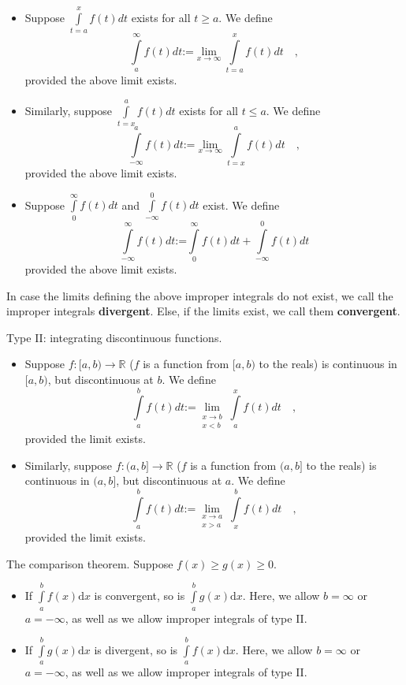 \documentclass[12pt]{book}
\newcommand{\diff}{\text{d}}
\newcommand{\eqdef}{\textbf{:=}}
\renewcommand{\emph}{\textbf}
\begin{document}
\begin{itemize}
\item Suppose $\int\limits_{t=a}^{x}f(t)dt$ exists for all $t\geq a$. We define 
\[
\int\limits_{a}^{\infty} f(t)dt\eqdef  \lim
\limits_{x\to \infty}\int\limits_{t=a}^{x}f(t)dt\quad,
\]
provided the above limit exists.
\item Similarly, suppose $\int\limits_{t=x}^{a}f(t)dt$ exists for all $t\leq a$. We define 
\[
\int\limits_{-\infty}^{a} f(t)dt\eqdef  \lim
\limits_{x\to \infty}\int\limits_{t=x}^{a}f(t)dt\quad,
\]
provided the above limit exists.
\item Suppose $\int\limits_{0}^{\infty}f(t)dt$ and $\int\limits_{-\infty}^{0}f(t)dt$  exist. We define
\[
\int\limits_{-\infty}^{\infty} f(t)dt\eqdef  \int\limits_{0}^{\infty}f(t)dt+\int\limits_{-\infty}^{0}f(t)dt
\]
provided the above limit exists.
\end{itemize}
In case the limits defining the above improper integrals do not exist, we call the improper integrals \emph{divergent}. Else, if the limits exist, we call them \emph{convergent}.  

Type II: integrating discontinuous functions.
\begin{itemize}
\item Suppose $f:[a,b)\to \mathbb R$ ($f$ is a function from $[a,b)$ to the reals) is continuous in $[a,b)$, but discontinuous at $b$. We define 
\[
\int\limits_{a}^{b}f(t)dt\eqdef \lim\limits_{\substack{x\to b \\ x<b}}\int\limits_{a}^{x} f(t)dt\quad , 
\]
provided the limit exists.
\item Similarly, suppose $f:(a,b]\to \mathbb R$ ($f$ is a function from $(a,b]$ to the reals) is continuous in $(a,b]$, but discontinuous at $a$. We define 
\[
\int\limits_{a}^{b}f(t)dt\eqdef \lim\limits_{\substack{x\to a \\ x>a}}\int\limits_{x}^{b} f(t)dt\quad , 
\]
provided the limit exists.
\end{itemize}

The comparison theorem. Suppose $f(x)\geq g(x)\geq 0$.
\begin{itemize}
\item If $\int\limits_{a}^{b}f(x)\diff x$ is convergent, so is $\int\limits_{a}^{b}g(x)\diff x$. Here, we allow $ b=\infty$ or $a=-\infty$, as well as we allow improper integrals of type II.
\item If $\int\limits_{a}^{b}g(x)\diff x$ is divergent, so is $\int\limits_{a}^{b}f(x)\diff x$. Here, we allow $ b=\infty$ or $a=-\infty$, as well as we allow improper integrals of type II.
\end{itemize}
\end{document}
